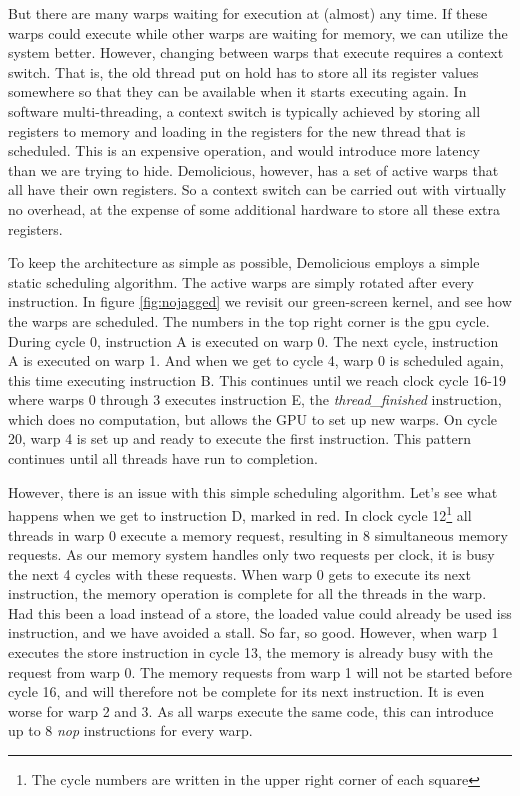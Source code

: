 \documentclass[../main/report.tex]{subfiles}
\begin{document}
But there are many warps waiting for execution at (almost) any time.
If these warps could execute while other warps are waiting for memory, we can utilize the system better.
However, changing between warps that execute requires a context switch.
That is, the old thread put on hold has to store all its register values somewhere so that they can be available when it starts executing again.
In software multi-threading, a context switch is typically achieved by storing all registers to memory and loading in the registers for the new thread that is scheduled.
This is an expensive operation, and would introduce more latency than we are trying to hide.
Demolicious, however, has a set of active warps that all have their own registers.
So a context switch can be carried out with virtually no overhead, at the expense of some additional hardware to store all these extra registers.

To keep the architecture as simple as possible, Demolicious employs a simple static scheduling algorithm.
The active warps are simply rotated after every instruction. In figure \ref{fig:nojagged} we revisit our green-screen kernel, and see how the warps are scheduled.
The numbers in the top right corner is the gpu cycle.
During cycle 0, instruction A is executed on warp 0.
The next cycle, instruction A is executed on warp 1.
And when we get to cycle 4, warp 0 is scheduled again, this time executing instruction B.
This continues until we reach clock cycle 16-19 where warps 0 through 3 executes instruction E, the \emph{thread\_finished} instruction, which does no computation, but allows the GPU to set up new warps.
On cycle 20, warp 4 is set up and ready to execute the first instruction.
This pattern continues until all threads have run to completion.

However, there is an issue with this simple scheduling algorithm.
Let's see what happens when we get to instruction D, marked in red.
In clock cycle 12\footnote{The cycle numbers are written in the upper right corner of each square} all threads in warp 0 execute a memory request, resulting in 8 simultaneous memory requests.
As our memory system handles only two requests per clock,
it is busy the next 4 cycles with these requests.
When warp 0 gets to execute its next instruction, the memory operation is complete for all the threads in the warp.
Had this been a load instead of a store, the loaded value could already be used iss instruction, and we have avoided a stall.
So far, so good.
However, when warp 1 executes the store instruction in cycle 13, the memory is already busy with the request from warp 0.
The memory requests from warp 1 will not be started before cycle 16, and will therefore not be complete for its next instruction.
It is even worse for warp 2 and 3. As all warps execute the same code, this can introduce up to 8 \emph{nop} instructions for every warp.
\end{document}
